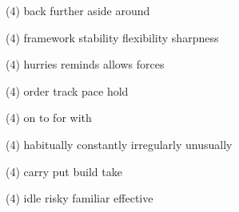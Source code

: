 \item
\begin{tasks}(4)
	\task back
	\task further
	\task aside
	\task around
\end{tasks}
\item
\begin{tasks}(4)
	\task framework
	\task stability
	\task flexibility
	\task sharpness
\end{tasks}
\item
\begin{tasks}(4)
	\task hurries
	\task reminds
	\task allows
	\task forces
\end{tasks}
\item
\begin{tasks}(4)
	\task order
	\task track
	\task pace
	\task hold
\end{tasks}
\item
\begin{tasks}(4)
	\task on
	\task to
	\task for
	\task with
\end{tasks}
\item
\begin{tasks}(4)
	\task habitually
	\task constantly
	\task irregularly
	\task unusually
\end{tasks}
\item
\begin{tasks}(4)
	\task carry
	\task put
	\task build
	\task take
\end{tasks}
\item
\begin{tasks}(4)
	\task idle
	\task risky
	\task familiar
	\task effective
\end{tasks}

